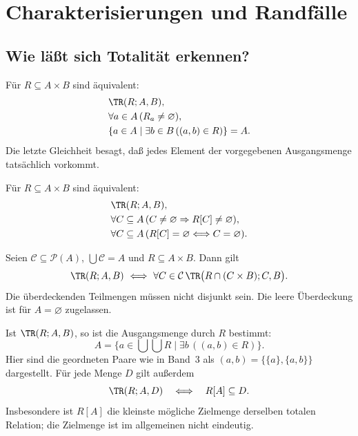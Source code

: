 \chapter{Charakterisierungen und Randfälle}
\label{b04guide:ch:criteria}

\section{Wie läßt sich Totalität erkennen?}

\begin{theorem}[Faserkriterium]\label{b04guide:thm:fiber}
Für $R\subseteq A\times B$ sind äquivalent:
\[
 \begin{aligned}
 &\TR(R;A,B),\\
 &\forall a\in A\,(R_a\ne\varnothing),\\
 &\{a\in A\mid\exists b\in B\,((a,b)\in R)\}=A.
 \end{aligned}
\]
Die letzte Gleichheit besagt, daß jedes Element der
vorgegebenen Ausgangsmenge tatsächlich vorkommt.
\end{theorem}

\begin{theorem}
\label{b04guide:thm:nonempty}
Für $R\subseteq A\times B$ sind äquivalent:
\[
 \begin{aligned}
 &\TR(R;A,B),\\
 &\forall C\subseteq A\,
          (C\ne\varnothing\Rightarrow R[C]\ne\varnothing),\\
 &\forall C\subseteq A\,
          (R[C]=\varnothing\Longleftrightarrow C=\varnothing).
 \end{aligned}
\]
\end{theorem}

\begin{theorem}
\label{b04guide:thm:local}
Seien $\mathcal C\subseteq\mathcal P(A)$,
$\bigcup\mathcal C=A$ und $R\subseteq A\times B$. Dann gilt
\[
 \TR(R;A,B)\ \Longleftrightarrow\
 \forall C\in\mathcal C\,
       \TR\bigl(R\cap(C\times B);C,B\bigr).
\]
Die überdeckenden Teilmengen müssen nicht disjunkt sein.
Die leere Überdeckung ist für $A=\varnothing$ zugelassen.
\end{theorem}

\begin{theorem}
\label{b04guide:thm:carriers}
Ist $\TR(R;A,B)$, so ist die Ausgangsmenge durch $R$ bestimmt:
\[
 A=\{a\in\bigcup\bigcup R\mid
                  \exists b\,((a,b)\in R)\}.
\]
Hier sind die geordneten Paare wie in Band~3 als
$(a,b)=\{\{a\},\{a,b\}\}$ dargestellt.
Für jede Menge $D$ gilt außerdem
\[
 \TR(R;A,D)\quad\Longleftrightarrow\quad R[A]\subseteq D.
\]
Insbesondere ist $R[A]$ die kleinste mögliche Zielmenge
derselben totalen Relation; die Zielmenge ist im allgemeinen
nicht eindeutig.
\end{theorem}

